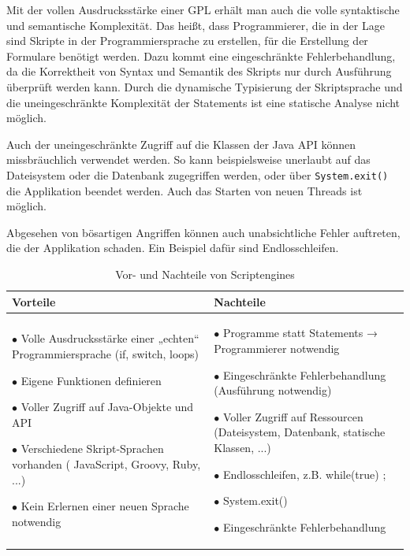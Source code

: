 Mit der vollen Ausdrucksstärke einer GPL erhält man auch die volle syntaktische und semantische Komplexität. Das heißt, dass Programmierer, die in der Lage sind Skripte in der Programmiersprache zu erstellen, für die Erstellung der Formulare benötigt werden. Dazu kommt eine ein\-ge\-schränk\-te Fehlerbehandlung, da die Korrektheit von Syntax und Semantik des Skripts nur durch Aus\-führ\-ung überprüft werden kann. Durch die dynamische Typisierung der Skriptsprache und die unein\-ge\-schränk\-te Komplexität der Statements ist eine statische Analyse nicht möglich.

Auch der unein\-ge\-schränk\-te Zugriff auf die Klassen der Java API können missbräuchlich verwendet werden. So kann beispielsweise unerlaubt auf das Dateisystem oder die Datenbank zugegriffen werden, oder über \texttt{System.exit()} die Applikation beendet werden. Auch das Starten von neuen Threads ist möglich. 

Abgesehen von bösartigen Angriffen können auch unabsichtliche Fehler auf\-tre\-ten, die der Applikation schaden. Ein Beispiel dafür sind Endlosschleifen.


\begin{table}
\begin{tabular}{|p{} | p{} |}
	\hline
	Vorteile & Nachteile \\
	\hline

	$\bullet$ Volle Ausdrucksstärke einer „echten“ Programmiersprache (if, switch, loops)
		
	$\bullet$ Eigene Funktionen definieren		 
		 
	$\bullet$ Voller Zugriff auf Java-Objekte und API
		 
	$\bullet$ Verschiedene Skript-Sprachen vorhanden ( JavaScript, Groovy, Ruby, ...)	

	$\bullet$ Kein Erlernen einer neuen Sprache not\-wen\-dig

	&
	
	$\bullet$ Programme statt Statements → Programmierer not\-wen\-dig
	
	$\bullet$ Eingeschränkte Fehlerbehandlung (Aus\-führ\-ung not\-wen\-dig)
	
	$\bullet$ Voller Zugriff auf Ressourcen (Dateisystem, Datenbank, statische Klassen, ...)
	
	$\bullet$ Endlosschleifen, z.B. while(true) { ; }
	
	$\bullet$ System.exit()
	
	$\bullet$ Eingeschränkte Fehlerbehandlung

	\\
	\hline

\end{tabular}
\caption{Vor- und Nachteile von Scriptengines}
\label{tbl_vergleich_scriptengines}
\end{table}


